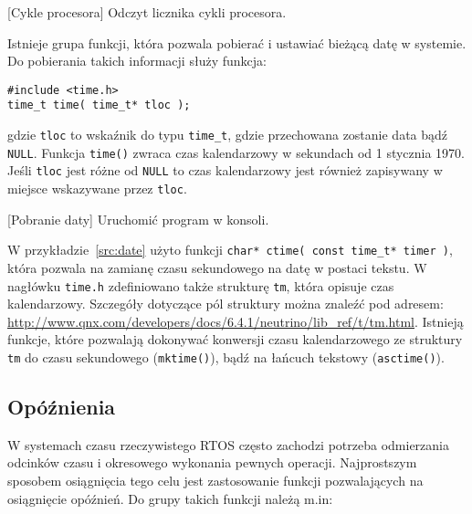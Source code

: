 \begin{example}{[Cykle procesora]} Odczyt licznika cykli procesora.

\end{example}

Istnieje grupa funkcji, która pozwala pobierać i ustawiać bieżącą datę w systemie. Do pobierania takich informacji służy funkcja:

\begin{lstlisting}[style=MyCStyle]
#include <time.h>
time_t time( time_t* tloc );
\end{lstlisting}

gdzie \lstinline[style=MyCStyle]{tloc} to wskaźnik do typu \lstinline[style=MyCStyle]{time_t}, gdzie przechowana zostanie data bądź \lstinline[style=MyCStyle]{NULL}. Funkcja \lstinline[style=MyCStyle]{time()} zwraca czas kalendarzowy w sekundach od 1 stycznia 1970. Jeśli \lstinline[style=MyCStyle]{tloc} jest różne od \lstinline[style=MyCStyle]{NULL} to czas kalendarzowy jest również zapisywany w miejsce wskazywane przez \lstinline[style=MyCStyle]{tloc}.

\begin{example}{[Pobranie daty]} Uruchomić program w konsoli.

\end{example}

W przykładzie~\ref{src:date} użyto funkcji \lstinline[style=MyCStyle]{char* ctime( const time_t* timer )}, która pozwala na zamianę czasu sekundowego na datę w postaci tekstu. W nagłówku \lstinline[style=MyCStyle]{time.h} zdefiniowano także strukturę \lstinline[style=MyCStyle]{tm}, która opisuje czas kalendarzowy. Szczegóły dotyczące pól struktury można znaleźć pod adresem: \url{http://www.qnx.com/developers/docs/6.4.1/neutrino/lib_ref/t/tm.html}. Istnieją funkcje, które pozwalają dokonywać konwersji czasu kalendarzowego ze struktury \lstinline[style=MyCStyle]{tm} do czasu sekundowego (\lstinline[style=MyCStyle]{mktime()}), bądź na łańcuch tekstowy (\lstinline[style=MyCStyle]{asctime()}).

\subsection{Opóźnienia}

W systemach czasu rzeczywistego RTOS często zachodzi potrzeba odmierzania odcinków czasu i okresowego wykonania pewnych operacji. Najprostszym sposobem osiągnięcia tego celu jest zastosowanie funkcji pozwalających na osiągnięcie opóźnień. Do grupy takich funkcji należą m.in:

